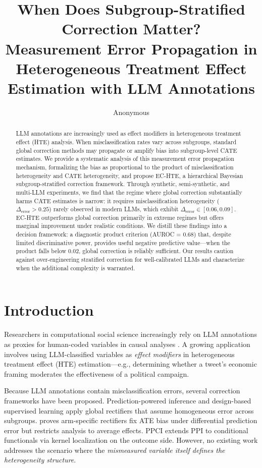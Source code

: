 \documentclass[11pt,a4paper]{article}
\title{When Does Subgroup-Stratified Correction Matter?\\Measurement Error Propagation in Heterogeneous Treatment Effect\\Estimation with LLM Annotations}
\author{Anonymous}
\begin{document}
\maketitle

\begin{abstract}
LLM annotations are increasingly used as effect modifiers in heterogeneous treatment effect (HTE) analysis. When misclassification rates vary across subgroups, standard global correction methods may propagate or amplify bias into subgroup-level CATE estimates. We provide a systematic analysis of this measurement error propagation mechanism, formalizing the bias as proportional to the product of misclassification heterogeneity and CATE heterogeneity, and propose EC-HTE, a hierarchical Bayesian subgroup-stratified correction framework.
Through synthetic, semi-synthetic, and multi-LLM experiments, we find that the regime where global correction substantially harms CATE estimates is narrow: it requires misclassification heterogeneity ($\Delta_{\text{error}} > 0.25$) rarely observed in modern LLMs, which exhibit $\Delta_{\text{error}} \in [0.06, 0.09]$. EC-HTE outperforms global correction primarily in extreme regimes but offers marginal improvement under realistic conditions. We distill these findings into a decision framework: a diagnostic product criterion (AUROC = 0.68) that, despite limited discriminative power, provides useful negative predictive value---when the product falls below 0.02, global correction is reliably sufficient. Our results caution against over-engineering stratified correction for well-calibrated LLMs and characterize when the additional complexity is warranted.
\end{abstract}

\section{Introduction}

Researchers in computational social science increasingly rely on LLM annotations as proxies for human-coded variables in causal analyses \citep{egami2024using,gilardi2023chatgpt}. A growing application involves using LLM-classified variables as \emph{effect modifiers} in heterogeneous treatment effect (HTE) estimation---e.g., determining whether a tweet's economic framing moderates the effectiveness of a political campaign.

Because LLM annotations contain misclassification errors, several correction frameworks have been proposed. Prediction-powered inference \citep[PPI;][]{angelopoulos2023prediction} and design-based supervised learning \citep[DSL;][]{egami2024using} apply global rectifiers that assume homogeneous error across subgroups. \citet{mozer2026arm} proves arm-specific rectifiers fix ATE bias under differential prediction error but restricts analysis to average effects. PPCI \citep{sui2026ppci} extends PPI to conditional functionals via kernel localization on the outcome side. However, no existing work addresses the scenario where the \emph{mismeasured variable itself defines the heterogeneity structure}.
\end{document}
